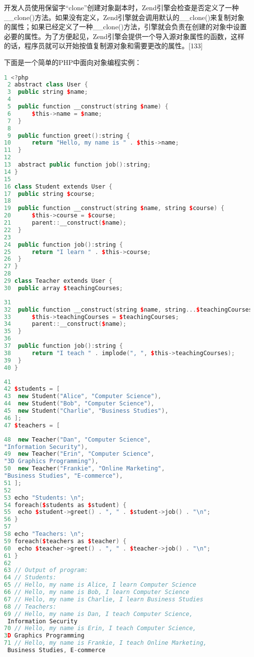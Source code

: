 开发人员使用保留字“clone”创建对象副本时，Zend引擎会检查是否定义了一种__clone()方法。如果没有定义，Zend引擎就会调用默认的__clone()来复制对象的属性；如果已经定义了一种__clone()方法，引擎就会负责在创建的对象中设置必要的属性。为了方便起见，Zend引擎会提供一个导入源对象属性的函数，这样的话，程序员就可以开始按值复制源对象和需要更改的属性。[133]

下面是一个简单的PHP中面向对象编程实例：
\begin{lstlisting}[language=cpp]
 1 <?php
 2 abstract class User {
 3 	public string $name;
 4 
 5 	public function __construct(string $name) {
 6 		$this->name = $name;
 7 	}
 8 
 9 	public function greet():string {
10 		return "Hello, my name is " . $this->name;
11 	}
12 
13 	abstract public function job():string;
14 }
15 
16 class Student extends User {
17 	public string $course;
18 
19 	public function __construct(string $name, string $course) {
20 		$this->course = $course;
21 		parent::__construct($name);
22 	}
23 
24 	public function job():string {
25 		return "I learn " . $this->course;
26 	}
27 }
28 
29 class Teacher extends User {
30 	public array $teachingCourses;
\end{lstlisting}
\begin{lstlisting}[language=cpp]
31 
32 	public function __construct(string $name, string...$teachingCourses) {
33 		$this->teachingCourses = $teachingCourses;
34 		parent::__construct($name);
35 	}
36 
37 	public function job():string {
38 		return "I teach " . implode(", ", $this->teachingCourses);
39 	}
40 }
\end{lstlisting}
\begin{lstlisting}[language=cpp]
41 
42 $students = [
43 	new Student("Alice", "Computer Science"),
44 	new Student("Bob", "Computer Science"),
45 	new Student("Charlie", "Business Studies"),
46 ];
47 $teachers = [
\end{lstlisting}
\begin{lstlisting}[language=cpp]
48 	new Teacher("Dan", "Computer Science", 
"Information Security"),
49 	new Teacher("Erin", "Computer Science", 
"3D Graphics Programming"),
50 	new Teacher("Frankie", "Online Marketing", 
"Business Studies", "E-commerce"),
51 ];
52 
53 echo "Students: \n";
54 foreach($students as $student) {
55 	echo $student->greet() . ", " . $student->job() . "\n";
56 }
57 
58 echo "Teachers: \n";
59 foreach($teachers as $teacher) {
60 	echo $teacher->greet() . ", " . $teacher->job() . "\n";
61 }
62 
63 // Output of program:
64 // Students:
65 // Hello, my name is Alice, I learn Computer Science
66 // Hello, my name is Bob, I learn Computer Science
67 // Hello, my name is Charlie, I learn Business Studies
68 // Teachers:
69 // Hello, my name is Dan, I teach Computer Science,
 Information Security
70 // Hello, my name is Erin, I teach Computer Science, 
3D Graphics Programming
71 // Hello, my name is Frankie, I teach Online Marketing,
 Business Studies, E-commerce
\end{lstlisting}
